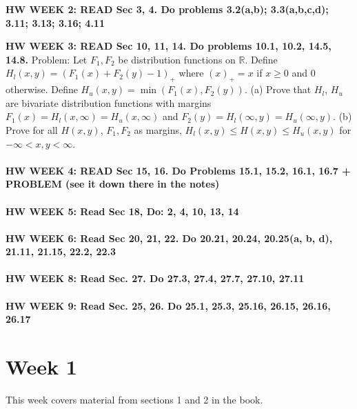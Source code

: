 \documentclass[12pt]{article}
\begin{document}
{\bf HW WEEK 2: READ Sec 3, 4.  Do problems 3.2(a,b); 3.3(a,b,c,d); 3.11; 3.13; 3.16; 4.11}

{\bf HW WEEK 3: READ Sec 10, 11, 14.  Do problems 10.1, 10.2, 14.5, 14.8.}
Problem: Let $F_1, F_2$ be distribution functions on $\mathbb{R}$.  Define $H_l(x,y) = (F_1(x) + F_2(y) - 1)_+$ where $(x)_+ = x$ if $x \ge 0$ and $0$ otherwise.  Define $H_u(x,y) = \min(F_1(x), F_2(y))$.  (a) Prove that $H_l$, $H_u$ are bivariate distribution functions with margins $F_1(x) = H_l(x, \infty) = H_u(x, \infty)$ and $F_2(y) = H_l(\infty, y) = H_u(\infty, y)$. (b) Prove for all $H(x,y)$, $F_1, F_2$ as margins, $H_l(x,y) \le H(x,y) \le H_u(x,y)$ for $-\infty < x,y < \infty$.
\\ \\
{\bf HW WEEK 4: READ Sec 15, 16.  Do Problems 15.1, 15.2, 16.1, 16.7 + PROBLEM (see it down there in the notes)}
\\ \\
{\bf HW WEEK 5: Read Sec 18, Do: 2, 4, 10, 13, 14}
\\ \\
{\bf HW WEEK 6: Read Sec 20, 21, 22.  Do 20.21, 20.24, 20.25(a, b, d), 21.11, 21.15, 22.2, 22.3}
\\ \\
{\bf HW WEEK 8: Read Sec. 27.  Do 27.3, 27.4, 27.7, 27.10, 27.11}
\\ \\
{\bf HW WEEK 9: Read Sec. 25, 26.  Do 25.1, 25.3, 25.16, 26.15, 26.16, 26.17}


\section{Week 1}
This week covers material from sections 1 and 2 in the book.
\end{document}
